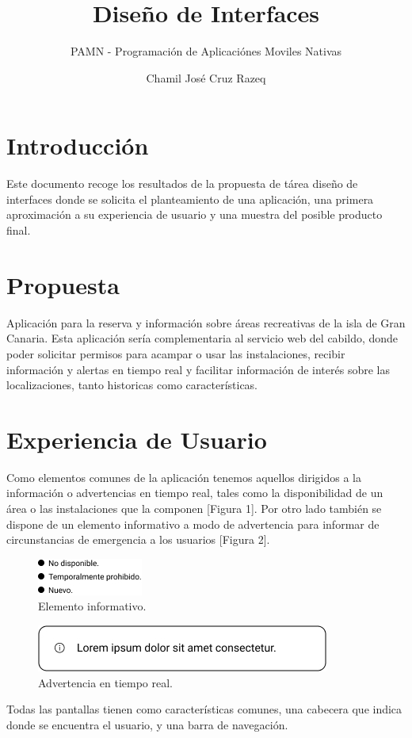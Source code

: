 \documentclass{scrartcl}
\title{Diseño de Interfaces}
\subtitle{\large PAMN - Programación de Aplicaciónes Moviles Nativas}
\author{Chamil José Cruz Razeq}
\begin{document}
    \maketitle
    \thispagestyle{empty}
    \newpage
    \tableofcontents
    \newpage

    \section{Introducción}
        Este documento recoge los resultados de la propuesta de tárea diseño de
        interfaces donde se solicita el planteamiento de una aplicación, una 
        primera aproximación a su experiencia de usuario y una muestra del
        posible producto final.
    
    \section{Propuesta}
        Aplicación para la reserva y información sobre áreas recreativas de la
        isla de Gran Canaria. Esta aplicación sería complementaria al servicio
        web del cabildo, donde poder solicitar permisos para acampar o usar las
        instalaciones, recibir información y alertas en tiempo real y facilitar
        información de interés sobre las localizaciones, tanto historicas como
        características.
    \newpage
    \section{Experiencia de Usuario}
        Como elementos comunes de la aplicación tenemos aquellos dirigidos a la
        información o advertencias en tiempo real, tales como la disponibilidad
        de un área o las instalaciones que la componen [Figura 1]. Por otro lado también se
        dispone de un elemento informativo a modo de advertencia para informar
        de circunstancias de emergencia a los usuarios [Figura 2].
        \begin{figure}[H]
            \centerline{\includegraphics[scale=0.20]{wirestate}}
            \caption{Elemento informativo.}
            \label{fig:wirestate}
        \end{figure}
        \begin{figure}[H]
            \centerline{\includegraphics[scale=0.20]{wiredanger}}
            \caption{Advertencia en tiempo real.}
            \label{fig:wiredanger}
        \end{figure}
        Todas las pantallas tienen como características comunes, una cabecera que
        indica donde se encuentra el usuario, y una barra de navegación.
        
\end{document}

